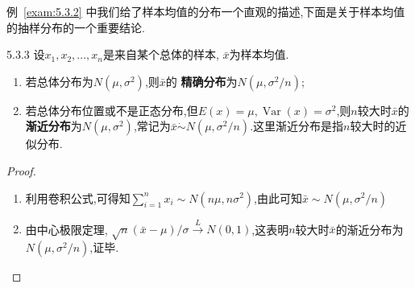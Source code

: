 例~\ref{exam:5.3.2} 中我们给了样本均值的分布一个直观的描述,下面是关于样本均值的抽样分布的一个重要结论.
\begin{theorem}{}{5.3.3}
设$x_1,x_2,\dotsc,x_n$是来自某个总体的样本, $\bar x$为样本均值.
\begin{enumerate}
\item 若总体分布为$N(\mu,\sigma^2)$,则$\bar x$的 \textbf{精确分布}为$N(\mu,\sigma^2/n)$;
\item 若总体分布位置或不是正态分布,但$E(x)=\mu,\operatorname{Var}(x)=\sigma^2$,则$n$较大时$\bar x$的 \textbf{渐近分布}为$N(\mu,\sigma^2)$,常记为$\bar x\dot{\sim}N(\mu,\sigma^2/n)$.这里渐近分布是指$n$较大时的近似分布.
\end{enumerate}
\end{theorem}
\begin{proof}
\begin{enumerate}
\item 利用卷积公式,可得知$\sum_{i=1}^nx_i\sim N(n\mu,n\sigma^2)$,由此可知$\bar x\sim N(\mu,\sigma^2/n)$
\item 由中心极限定理, $\sqrt n(\bar x-\mu)/\sigma\xrightarrow{L}N(0,1)$,这表明$n$较大时$\bar x$的渐近分布为$N(\mu,\sigma^2/n)$,证毕.
\end{enumerate}
\end{proof}
